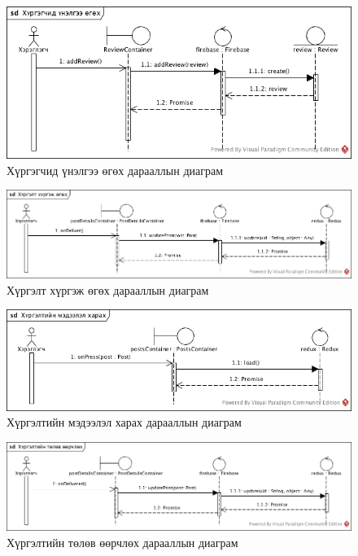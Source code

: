 \begin{figure}[H]
	\centering
	\includegraphics[width=\textwidth]{Figures/shinjilgee/seq/hurgegchid_unelgee_ogoh.jpg}
  \caption{Хүргэгчид үнэлгээ өгөх дарааллын диаграм}
\end{figure}

\begin{figure}[H]
	\centering
	\includegraphics[width=\textwidth]{Figures/shinjilgee/seq/hurgelt_hurgej_ogoh.jpg}
  \caption{Хүргэлт хүргэж өгөх дарааллын диаграм}
\end{figure}

\begin{figure}[H]
	\centering
	\includegraphics[width=\textwidth]{Figures/shinjilgee/seq/hurgeltiin_medeelel_harah.jpg}
  \caption{Хүргэлтийн мэдээлэл харах дарааллын диаграм}
\end{figure}

\begin{figure}[H]
	\centering
	\includegraphics[width=\textwidth]{Figures/shinjilgee/seq/hurgeltiin_tolov_oorchloh.jpg}
  \caption{Хүргэлтийн төлөв өөрчлөх дарааллын диаграм}
\end{figure}

